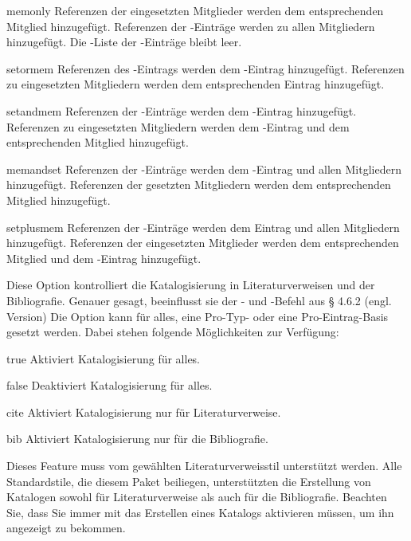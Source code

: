 \documentclass{ltxdockit}[2011/03/25]
\begin{document}
\begin{optionlist}
\begin{valuelist}
\item[memonly] Referenzen der eingesetzten Mitglieder werden dem entsprechenden
Mitglied hinzugefügt. Referenzen der -Einträge werden zu allen
Mitgliedern hinzugefügt. Die -Liste der -Einträge
bleibt leer.

\item[setormem] Referenzen des -Eintrags werden dem
-Eintrag hinzugefügt. Referenzen zu eingesetzten Mitgliedern werden
dem entsprechenden Eintrag hinzugefügt.

\item[setandmem] Referenzen der -Einträge werden dem
-Eintrag hinzugefügt. Referenzen zu eingesetzten Mitgliedern werden
dem -Eintrag und dem entsprechenden Mitglied hinzugefügt.

\item[memandset] Referenzen der -Einträge werden dem
-Eintrag und allen Mitgliedern hinzugefügt. Referenzen der
gesetzten Mitgliedern werden dem entsprechenden Mitglied hinzugefügt.

\item[setplusmem] Referenzen der -Einträge werden dem 
Eintrag und allen Mitgliedern hinzugefügt. Referenzen der eingesetzten
Mitglieder werden dem entsprechenden Mitglied und dem -Eintrag
hinzugefügt.

\end{valuelist}


Diese Option kontrolliert die Katalogisierung in Literaturverweisen und der
Bibliografie. Genauer gesagt, beeinflusst sie der - und
-Befehl aus § 4.6.2 (engl. Version) %
Die Option kann für alles,
eine Pro-Typ- oder eine Pro-Eintrag-Basis gesetzt werden. Dabei stehen folgende
Möglichkeiten zur Verfügung:

\begin{valuelist} 
\item[true] Aktiviert Katalogisierung für alles.  
\item[false] Deaktiviert Katalogisierung für alles.  
\item[cite] Aktiviert Katalogisierung
nur für Literaturverweise.  
\item[bib] Aktiviert Katalogisierung nur für die
Bibliografie.  
\end{valuelist} 
%
Dieses Feature muss vom gewählten Literaturverweisstil unterstützt werden. Alle
Standardstile, die diesem Paket beiliegen, unterstützten die Erstellung von
Katalogen sowohl für Literaturverweise als auch für die Bibliografie. Beachten
Sie, dass Sie immer mit  das Erstellen eines Katalogs aktivieren
müssen, um ihn angezeigt zu bekommen.


\end{optionlist}
\end{document}
